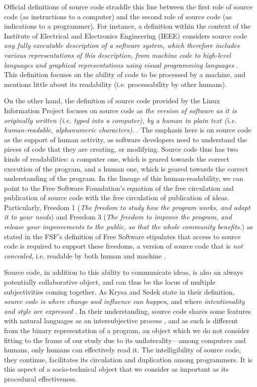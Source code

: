 Official definitions of source code straddle this line between the first role of source code (as instructions to a computer) and the second role of source code (as indications to a programmer). For instance, a definition within the context of the Institute of Electrical and Electronics Engineering (IEEE) considers source code \emph{any fully executable description of a software system, which therefore includes various representations of this description, from machine code to high-level languages and graphical representations using visual programming languages} \citep{harman_why_2010}. This definition focuses on the ability of code to be processed by a machine, and mentions little about its readability (i.e. processability by other humans).

On the other hand, the definition of source code provided by the Linux Information Project focuses on source code as \emph{the version of software as it is originally written (i.e. typed into a computer), by a human in plain text (i.e. human-readable, alphanumeric characters).} \citep{linuxinformationproject_source_2006}. The emphasis here is on source code as the support of human activity, as software developers need to understand the pieces of code that they are creating, or modifying. Source code thus has two kinds of readabilities: a computer one, which is geared towards the correct execution of the program, and a human one, which is geared towards the correct understanding of the program. In the lineage of this human-readability, we can point to the Free Software Foundation's equation of the free circulation and publication of source code with the free circulation of publication of ideas. Particularly, Freedom 1 (\emph{The freedom to study how the program works, and adapt it to your needs}) and Freedom 3 (\emph{The freedom to improve the program, and release your improvements to the public, so that the whole community benefits.}) as stated in the FSF's definition of Free Software stipulates that access to source code is required to support these freedoms, a version of source code that is \emph{not concealed}, i.e. readable by both human and machine \citep{stallman_free_2002}.

Source code, in addition to this ability to communicate ideas, is also an always potentially collaborative object, and can thus be the locus of multiple subjectivities coming together. As Krysa and Sedek state in their definition, \emph{source code is where change and influence can happen}, and where \emph{intentionality and style are expressed} \citep{fuller_software_2008}. In their understanding, source code shares some features with natural languages as an intersubjective process \citep{voloshinov_marxism_1986}, and as such is different from the binary representation of a program, an object which we do not consider fitting to the frame of our study due to its unilaterality—among computers and humans, only humans can effectively read it. The intelligibility of source code, they continue, facilitates its circulation and duplication among programmers. It is this aspect of a socio-technical object that we consider as important as its procedural effectiveness.

